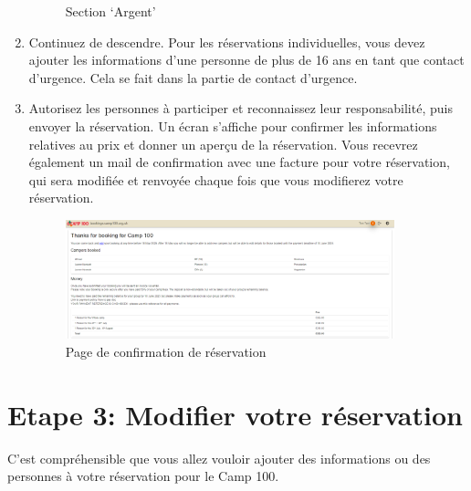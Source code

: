 \documentclass[a4paper, 11pt]{report}
\begin{document}
\begin{enumerate}
\begin{figure}[H]
        \caption{Section `Argent'}
    \end{figure}
    \item Continuez de descendre. Pour les r\'eservations individuelles, vous devez ajouter les informations d'une personne de plus de 16 ans en tant que contact d'urgence. Cela se fait dans la partie de contact d'urgence.
    \item Autorisez les personnes \`a participer et reconnaissez leur responsabilit\'e, puis envoyer la r\'eservation. Un \'ecran s'affiche pour confirmer les informations relatives au prix et donner un aperçu de la r\'eservation. Vous recevrez \'egalement un mail de confirmation avec une facture pour votre r\'eservation, qui sera modifi\'ee et renvoy\'ee chaque fois que vous modifierez votre r\'eservation. 
    \begin{figure}[H]
        \centering
        \includegraphics[width=0.9\textwidth]{assets/2-booking-confirmation.png}
        \caption{Page de confirmation de r\'eservation}
    \end{figure}
    
\end{enumerate}


\chapter[Etape 3: Modifier votre r\'eservation]{Etape 3: Modifier votre r\'eservation}
\label{chap:edit}

C'est compr\'ehensible que vous allez vouloir ajouter des informations ou des personnes \`a votre r\'eservation pour le Camp 100. 
\end{document}
